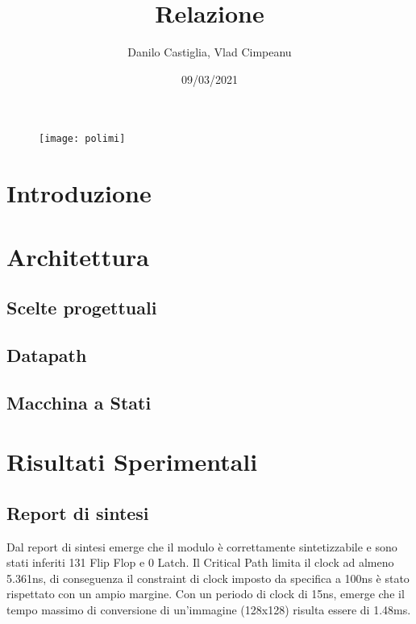 \documentclass{article}
\title{Relazione}
\date{09/03/2021}
\author{Danilo Castiglia, Vlad Cimpeanu}
\begin{document}
\maketitle
{}


\begin{figure}[h!] %
\centering
  \texttt{[image: polimi]}
  \label{fig:polimi}
\end{figure}

\newpage

\section{Introduzione}


\section{Architettura}
\subsection{Scelte progettuali}

\newpage
\subsection{Datapath}

\subsection{Macchina a Stati}




\section{Risultati Sperimentali}
\subsection{Report di sintesi}
Dal report di sintesi emerge che il modulo è correttamente sintetizzabile e sono stati inferiti 131 Flip Flop e 0 Latch. Il Critical Path limita il clock ad almeno 5.361ns, di conseguenza il constraint di clock imposto da specifica a 100ns è stato rispettato con un ampio margine.
Con un periodo di clock di 15ns, emerge che il tempo massimo di conversione di un'immagine (128x128) risulta essere di 1.48ms.
\end{document}
